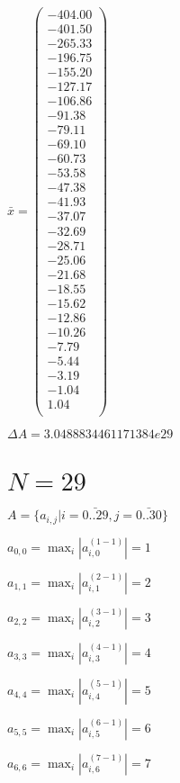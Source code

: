 \documentclass[a4paper,12pt]{article}
\begin{document}
$\bar { x } = \begin{pmatrix}
-404.00 \\
-401.50 \\
-265.33 \\
-196.75 \\
-155.20 \\
-127.17 \\
-106.86 \\
-91.38 \\
-79.11 \\
-69.10 \\
-60.73 \\
-53.58 \\
-47.38 \\
-41.93 \\
-37.07 \\
-32.69 \\
-28.71 \\
-25.06 \\
-21.68 \\
-18.55 \\
-15.62 \\
-12.86 \\
-10.26 \\
-7.79 \\
-5.44 \\
-3.19 \\
-1.04 \\
1.04 \\
\end{pmatrix}
$

$\Delta A = 3.0488834461171384e29$



\section{ $N = 29$ }
$A = \{ a _{ i, j } | i = \bar { 0..29 }, j = \bar { 0..30 } \}$

$a _{ 0, 0 } =  \max _i |a _{ i, 0 } ^{ (1 - 1) } | = 1$

$a _{ 1, 1 } =  \max _i |a _{ i, 1 } ^{ (2 - 1) } | = 2$

$a _{ 2, 2 } =  \max _i |a _{ i, 2 } ^{ (3 - 1) } | = 3$

$a _{ 3, 3 } =  \max _i |a _{ i, 3 } ^{ (4 - 1) } | = 4$

$a _{ 4, 4 } =  \max _i |a _{ i, 4 } ^{ (5 - 1) } | = 5$

$a _{ 5, 5 } =  \max _i |a _{ i, 5 } ^{ (6 - 1) } | = 6$

$a _{ 6, 6 } =  \max _i |a _{ i, 6 } ^{ (7 - 1) } | = 7$
\end{document}
